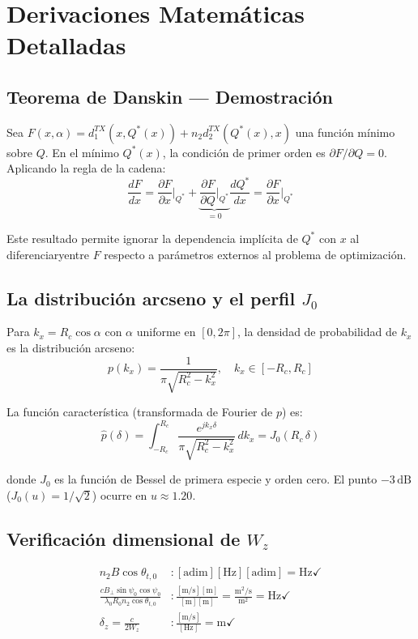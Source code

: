 \documentclass[12pt,a4paper,oneside]{book}
\begin{document}
\appendix
\chapter{Derivaciones Matemáticas Detalladas}

\section{Teorema de Danskin — Demostración}

Sea $F(x, \alpha) = d_1^{TX}(x,Q^*(x)) + n_2 d_2^{TX}(Q^*(x),x)$ una función mínimo sobre $Q$. En el mínimo $Q^*(x)$, la condición de primer orden es $\partial F/\partial Q = 0$. Aplicando la regla de la cadena:
\[
\frac{dF}{dx} = \frac{\partial F}{\partial x}\bigg|_{Q^*} + \underbrace{\frac{\partial F}{\partial Q}\bigg|_{Q^*}}_{=0}\frac{dQ^*}{dx} = \frac{\partial F}{\partial x}\bigg|_{Q^*}
\]

Este resultado permite ignorar la dependencia implícita de $Q^*$ con $x$ al diferenciaryentre $F$ respecto a parámetros externos al problema de optimización.

\section{La distribución arcseno y el perfil $J_0$}

Para $k_x = R_c\cos\alpha$ con $\alpha$ uniforme en $[0,2\pi]$, la densidad de probabilidad de $k_x$ es la distribución arcseno:
\[
p(k_x) = \frac{1}{\pi\sqrt{R_c^2-k_x^2}}, \quad k_x \in [-R_c, R_c]
\]

La función característica (transformada de Fourier de $p$) es:
\[
\hat{p}(\delta) = \int_{-R_c}^{R_c} \frac{e^{jk_x\delta}}{\pi\sqrt{R_c^2-k_x^2}}\,dk_x = J_0(R_c\,\delta)
\]

donde $J_0$ es la función de Bessel de primera especie y orden cero. El punto $-3\,\text{dB}$ ($J_0(u)=1/\sqrt{2}$) ocurre en $u \approx 1.20$.

\section{Verificación dimensional de $W_z$}

\begin{align*}
n_2 B\cos\theta_{t,0} &: [\text{adim}][\text{Hz}][\text{adim}] = \text{Hz} \checkmark \\
\frac{c B_\perp\sin\psi_0\cos\psi_0}{\lambda_0 R_0 n_2\cos\theta_{t,0}} &: \frac{[\text{m/s}][\text{m}]}{[\text{m}][\text{m}]} = \frac{\text{m}^2/\text{s}}{\text{m}^2} = \text{Hz} \checkmark \\
\delta_z = \frac{c}{2W_z} &: \frac{[\text{m/s}]}{[\text{Hz}]} = \text{m} \checkmark
\end{align*}
\end{document}
